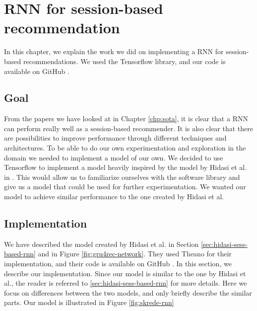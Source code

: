 \chapter{RNN for session-based recommendation}
In this chapter, we explain the work we did on implementing a RNN for session-based recommendations. We used the Tensorflow \cite{tensorflow2015-whitepaper} library, and our code is available on GitHub \cite{skrede:code}.

\section{Goal}
From the papers we have looked at in Chapter \ref{chp:sota}, it is clear that a RNN can perform really well as a session-based recommender. It is also clear that there are possibilities to improve performance through different techniques and architectures. To be able to do our own experimentation and exploration in the domain we needed to implement a model of our own. We decided to use Tensorflow to implement a model heavily inspired by the model by Hidasi et al. in \cite{DBLP:journals/corr/HidasiKBT15}. This would allow us to familiarize ourselves with the software library and give us a model that could be used for further experimentation. We wanted our model to achieve similar performance to the one created by Hidasi et al.

\section{Implementation}
We have described the model created by Hidasi et al. in Section \ref{sec:hidasi-sess-based-rnn} and in Figure \ref{fig:gru4rec-network}. They used Theano for their implementation, and their code is available on GitHub \cite{hidasi:code}. In this section, we describe our implementation. Since our model is similar to the one by Hidasi et al., the reader is referred to \ref{sec:hidasi-sess-based-rnn} for more details. Here we focus on differences between the two models, and only briefly describe the similar parts. Our model is illustrated in Figure \ref{fig:skrede-rnn}

